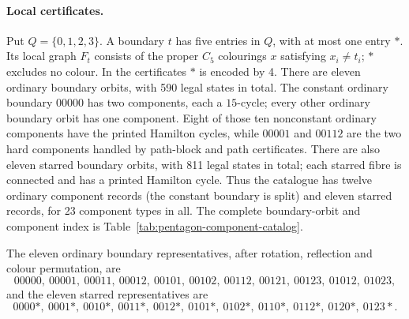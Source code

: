 \documentclass[11pt]{article}
\theoremstyle{remark}
\numberwithin{equation}{section}
\numberwithin{table}{section}
\begin{document}
\paragraph{Local certificates.}
Put $Q=\{0,1,2,3\}$. A boundary $t$ has five entries in $Q$, with at most
one entry $\ast$. Its local graph $F_t$ consists of the proper $C_5$
colourings $x$ satisfying $x_i\ne t_i$; $\ast$ excludes no colour.
In the certificates $\ast$ is encoded by 4.
There are eleven ordinary boundary orbits, with 590 legal states in
total. The constant ordinary boundary $00000$ has two components, each
a $15$-cycle; every other ordinary boundary orbit has one component.
Eight of those ten nonconstant ordinary components have the printed
Hamilton cycles, while $00001$ and $00112$ are the two hard components
handled by path-block and path certificates. There are also eleven
starred boundary orbits, with 811 legal states in total; each starred
fibre is connected and has a printed Hamilton cycle. Thus the catalogue
has twelve ordinary component records (the constant boundary is split)
and eleven starred records, for 23 component types in all. The complete
boundary-orbit and component index is Table~\ref{tab:pentagon-component-catalog}.

The eleven ordinary boundary representatives, after rotation, reflection
and colour permutation, are
\[
00000,\ 00001,\ 00011,\ 00012,\ 00101,\ 00102,\ 00112,\
00121,\ 00123,\ 01012,\ 01023,
\]
and the eleven starred representatives are
\[
0000\ast,\ 0001\ast,\ 0010\ast,\ 0011\ast,\ 0012\ast,\
0101\ast,\ 0102\ast,\ 0110\ast,\ 0112\ast,\ 0120\ast,\ 0123\ast.
\]
\end{document}
